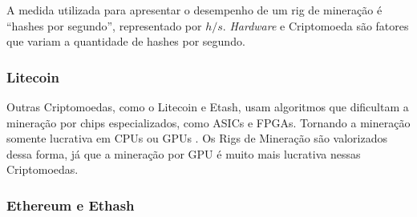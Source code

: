 \documentclass[
article,			%
12pt,				%
openright,			%
oneside,			%
a4paper,			%
chapter=TITLE,		%
section=TITLE,		%
subsection=TITLE,	%
subsubsection=TITLE,%
subsubsubsection=TITLE, %
english,			%
brazil,				%
]{abntex2}
\begin{document}
\pagebreak

A medida utilizada para apresentar o desempenho de um rig de mineração
é ``hashes por segundo'', representado por $h/s$. \emph{Hardware} e
Criptomoeda são fatores que variam a quantidade de hashes por segundo.

\subsubsection{Litecoin}

Outras Criptomoedas, como o Litecoin e Etash, usam algoritmos que
dificultam a mineração por chips especializados, como ASICs e FPGAs.
Tornando a mineração somente lucrativa em CPUs ou GPUs
\cite{Weber2012}. Os Rigs de Mineração são valorizados dessa forma, já
que a mineração por GPU é muito mais lucrativa nessas Criptomoedas.

\subsubsection{Ethereum e Ethash}

\pagebreak 
\end{document}
